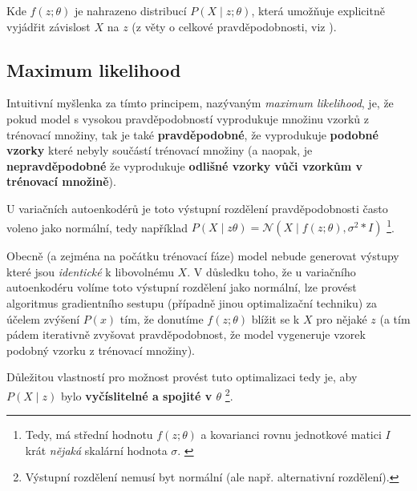 Kde $f(z;\theta)$ je nahrazeno distribucí $P(X\mid z;\theta)$, která umožňuje explicitně vyjádřit závislost $X$ na $z$ (z věty o celkové pravděpodobnosti, viz \cite{Murphy2022}). \cite{Doersch2021}

\subsection{Maximum likelihood}
\label{sec:maximum_likelihood}
Intuitivní myšlenka za tímto principem, nazývaným \emph{maximum likelihood}, je, že pokud model s vysokou pravděpodobností vyprodukuje množinu vzorků z trénovací množiny, tak je také \textbf{pravděpodobné}, že vyprodukuje \textbf{podobné vzorky} které nebyly součástí trénovací množiny (a naopak, je  \textbf{nepravděpodobné} že vyprodukuje \textbf{odlišné vzorky vůči vzorkům v trénovací množině}). \cite{Doersch2021}

U variačních autoenkodérů je toto výstupní rozdělení pravděpodobnosti často voleno jako normální, tedy například $P(X\mid z\theta) = \mathcal{N}(X\mid f(z;\theta), \sigma^2 * I)$
\footnote{Tedy, má střední hodnotu $f(z;\theta)$ a kovarianci rovnu jednotkové matici $I$ krát \emph{nějaká} skalární hodnota $\sigma$. \cite{Doersch2021}}. \cite{Doersch2021}

Obecně (a zejména na počátku trénovací fáze) model nebude generovat výstupy které jsou \emph{identické} k libovolnému $X$.
V důsledku toho, že u variačního autoenkodéru volíme toto výstupní rozdělení jako normální, lze provést algoritmus gradientního sestupu (případně jinou optimalizační techniku) za účelem zvýšení $P(x)$ tím, že donutíme $f(z;\theta)$ blížit se k $X$ pro nějaké $z$ (a tím pádem iterativně zvyšovat pravděpodobnost, že model vygeneruje vzorek podobný vzorku z trénovací množiny). \cite{Doersch2021}

Důležitou vlastností pro možnost provést tuto optimalizaci tedy je, aby $P(X \mid z)$ bylo \textbf{vyčíslitelné a spojité v $\theta$} \footnote{Výstupní rozdělení nemusí byt normální (ale např. alternativní rozdělení).}. \cite{Doersch2021}